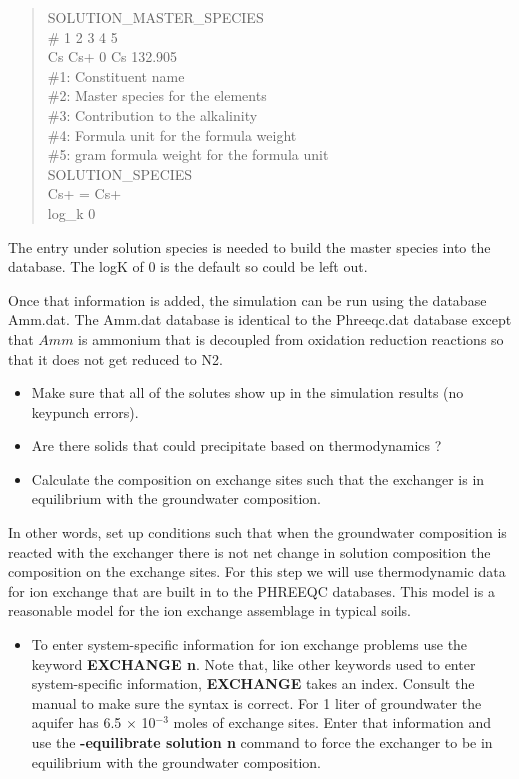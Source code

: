 \begin{quote}
{\color{red}SOLUTION\_MASTER\_SPECIES \\
\# 1 2 3 4 5 \\
  Cs	Cs+	0	Cs	132.905 \\
\#1: Constituent name \\
\#2: Master species for the elements \\
\#3: Contribution to the alkalinity \\
\#4: Formula unit for the formula weight \\
\#5: gram formula weight for the formula unit \\
SOLUTION\_SPECIES \\
Cs+  =  Cs+ \\
log\_k  0 }\\
\end{quote}

The entry under solution species is needed to build the master species into the database.  
The logK of 0 is the default so could be left out.

Once that information is added, the simulation can be run using the database Amm.dat. 
The Amm.dat database is identical to the Phreeqc.dat
database except that $Amm$ is ammonium that is decoupled from 
oxidation reduction reactions so that it does not get reduced to N2.  

\begin{itemize}
\item Make sure that all of the solutes show up in the simulation results (no keypunch errors).
\item Are there solids that could precipitate based on thermodynamics ?
\end{itemize}

\begin{itemize}
\item Calculate the composition on exchange sites such that the exchanger 
is in equilibrium with the groundwater composition.  
\end{itemize}

In other words, set up conditions such that when the groundwater composition 
is reacted with the exchanger there is not net change in solution composition 
the composition on the exchange sites.  
For this step we will use thermodynamic data for ion exchange 
that are built in to the PHREEQC databases.  
This model is a reasonable model for the ion exchange assemblage in typical soils.

\begin{itemize}
\item To enter system-specific information for ion exchange 
problems use the keyword {\color{red}\textbf{EXCHANGE n}}.  
Note that, like other keywords used to enter system-specific information, 
{\color{red}\textbf{EXCHANGE}} takes an index. Consult the manual to make sure the syntax is correct.  
For 1 liter of groundwater the aquifer has 6.5 $\times$ 10$^{-3}$ moles of exchange sites.  
Enter that information and use the {\color{red}\textbf{-equilibrate solution n}} command to 
force the exchanger to be in equilibrium with the groundwater composition.
\end{itemize}


